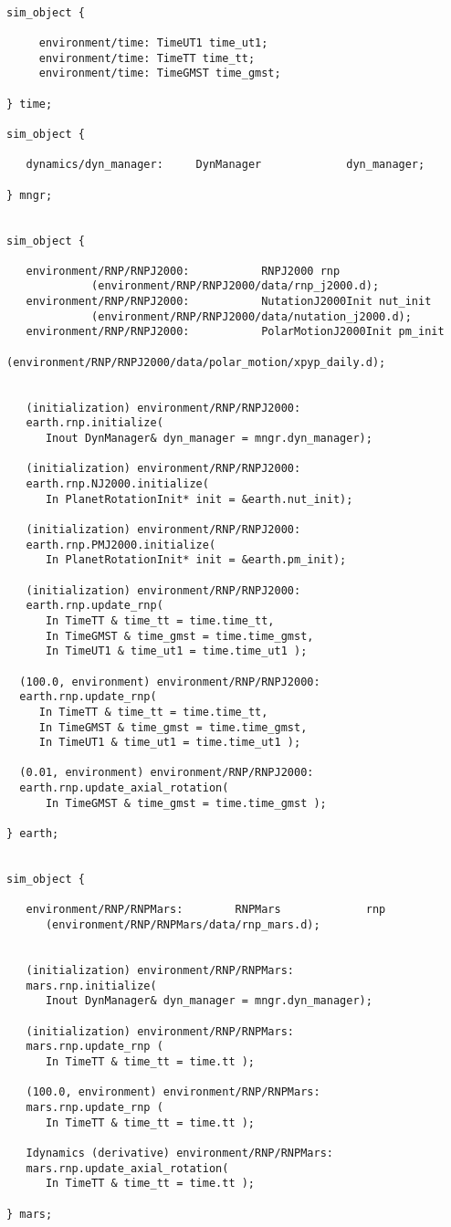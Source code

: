 \begin{verbatim}

sim_object {

     environment/time: TimeUT1 time_ut1;
     environment/time: TimeTT time_tt;
     environment/time: TimeGMST time_gmst;

} time;

sim_object {

   dynamics/dyn_manager:     DynManager             dyn_manager;

} mngr;


sim_object {

   environment/RNP/RNPJ2000:           RNPJ2000 rnp
             (environment/RNP/RNPJ2000/data/rnp_j2000.d);
   environment/RNP/RNPJ2000:           NutationJ2000Init nut_init
             (environment/RNP/RNPJ2000/data/nutation_j2000.d);
   environment/RNP/RNPJ2000:           PolarMotionJ2000Init pm_init
             (environment/RNP/RNPJ2000/data/polar_motion/xpyp_daily.d);


   (initialization) environment/RNP/RNPJ2000:
   earth.rnp.initialize(
      Inout DynManager& dyn_manager = mngr.dyn_manager);

   (initialization) environment/RNP/RNPJ2000:
   earth.rnp.NJ2000.initialize(
      In PlanetRotationInit* init = &earth.nut_init);

   (initialization) environment/RNP/RNPJ2000:
   earth.rnp.PMJ2000.initialize(
      In PlanetRotationInit* init = &earth.pm_init);

   (initialization) environment/RNP/RNPJ2000:
   earth.rnp.update_rnp(
      In TimeTT & time_tt = time.time_tt,
      In TimeGMST & time_gmst = time.time_gmst,
      In TimeUT1 & time_ut1 = time.time_ut1 );

  (100.0, environment) environment/RNP/RNPJ2000:
  earth.rnp.update_rnp(
     In TimeTT & time_tt = time.time_tt,
     In TimeGMST & time_gmst = time.time_gmst,
     In TimeUT1 & time_ut1 = time.time_ut1 );

  (0.01, environment) environment/RNP/RNPJ2000:
  earth.rnp.update_axial_rotation(
      In TimeGMST & time_gmst = time.time_gmst );

} earth;


sim_object {

   environment/RNP/RNPMars:        RNPMars             rnp
      (environment/RNP/RNPMars/data/rnp_mars.d);


   (initialization) environment/RNP/RNPMars:
   mars.rnp.initialize(
      Inout DynManager& dyn_manager = mngr.dyn_manager);

   (initialization) environment/RNP/RNPMars:
   mars.rnp.update_rnp (
      In TimeTT & time_tt = time.tt );

   (100.0, environment) environment/RNP/RNPMars:
   mars.rnp.update_rnp (
      In TimeTT & time_tt = time.tt );

   Idynamics (derivative) environment/RNP/RNPMars:
   mars.rnp.update_axial_rotation(
      In TimeTT & time_tt = time.tt );

} mars;

\end{verbatim}

